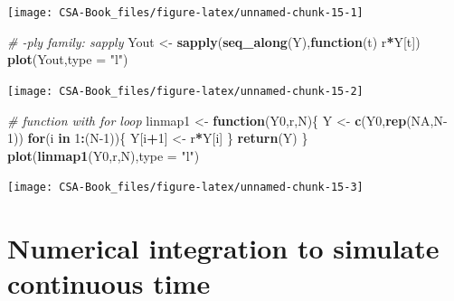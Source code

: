 \documentclass[12pt,]{book}
\newenvironment{Shaded}{\begin{snugshade}}{\end{snugshade}}
\newcommand{\CommentTok}[1]{\textcolor[rgb]{0.56,0.35,0.01}{\textit{#1}}}
\newcommand{\ControlFlowTok}[1]{\textcolor[rgb]{0.13,0.29,0.53}{\textbf{#1}}}
\newcommand{\DataTypeTok}[1]{\textcolor[rgb]{0.13,0.29,0.53}{#1}}
\newcommand{\DecValTok}[1]{\textcolor[rgb]{0.00,0.00,0.81}{#1}}
\newcommand{\KeywordTok}[1]{\textcolor[rgb]{0.13,0.29,0.53}{\textbf{#1}}}
\newcommand{\NormalTok}[1]{#1}
\newcommand{\OperatorTok}[1]{\textcolor[rgb]{0.81,0.36,0.00}{\textbf{#1}}}
\newcommand{\OtherTok}[1]{\textcolor[rgb]{0.56,0.35,0.01}{#1}}
\newcommand{\StringTok}[1]{\textcolor[rgb]{0.31,0.60,0.02}{#1}}
\let\stdsection\section
\renewcommand\section{\newpage\stdsection}
\begin{document}
\begin{center}\texttt{[image: CSA-Book\_files/figure-latex/unnamed-chunk-15-1]} \end{center}

\begin{Shaded}
\begin{Highlighting}[]
\CommentTok{# -ply family: sapply}
\NormalTok{Yout <-}\StringTok{ }\KeywordTok{sapply}\NormalTok{(}\KeywordTok{seq_along}\NormalTok{(Y),}\ControlFlowTok{function}\NormalTok{(t) r}\OperatorTok{*}\NormalTok{Y[t])}
\KeywordTok{plot}\NormalTok{(Yout,}\DataTypeTok{type =} \StringTok{"l"}\NormalTok{)}
\end{Highlighting}
\end{Shaded}

\begin{center}\texttt{[image: CSA-Book\_files/figure-latex/unnamed-chunk-15-2]} \end{center}

\begin{Shaded}
\begin{Highlighting}[]
\CommentTok{# function with for loop}
\NormalTok{linmap1 <-}\StringTok{ }\ControlFlowTok{function}\NormalTok{(Y0,r,N)\{}
\NormalTok{  Y  <-}\StringTok{ }\KeywordTok{c}\NormalTok{(Y0,}\KeywordTok{rep}\NormalTok{(}\OtherTok{NA}\NormalTok{,N}\DecValTok{-1}\NormalTok{))}
  \ControlFlowTok{for}\NormalTok{(i }\ControlFlowTok{in} \DecValTok{1}\OperatorTok{:}\NormalTok{(N}\DecValTok{-1}\NormalTok{))\{}
\NormalTok{    Y[i}\OperatorTok{+}\DecValTok{1}\NormalTok{] <-}\StringTok{ }\NormalTok{r}\OperatorTok{*}\NormalTok{Y[i]}
\NormalTok{  \}}
  \KeywordTok{return}\NormalTok{(Y)}
\NormalTok{\}}
\KeywordTok{plot}\NormalTok{(}\KeywordTok{linmap1}\NormalTok{(Y0,r,N),}\DataTypeTok{type =} \StringTok{"l"}\NormalTok{)}
\end{Highlighting}
\end{Shaded}

\begin{center}\texttt{[image: CSA-Book\_files/figure-latex/unnamed-chunk-15-3]} \end{center}

\hypertarget{numerical-integration-to-simulate-continuous-time}{%
\section{\texorpdfstring{\textbf{Numerical integration to simulate continuous time}}{Numerical integration to simulate continuous time}}\label{numerical-integration-to-simulate-continuous-time}}
\end{document}
